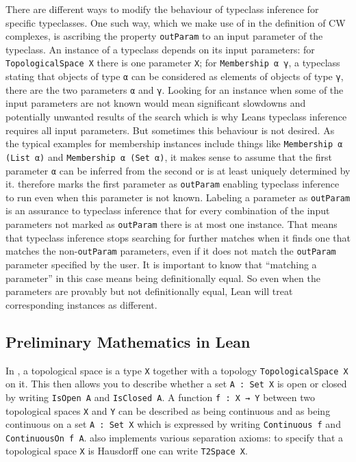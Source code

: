 There are different ways to modify the behaviour of typeclass inference for specific typeclasses. 
One such way, which we make use of in the definition of CW complexes, is ascribing the property \lstinline|outParam| to an input parameter of the typeclass. 
An instance of a typeclass depends on its input parameters: for \lstinline|TopologicalSpace X| there is one parameter \lstinline|X|; for \lstinline|Membership α γ|, a typeclass stating that objects of type \lstinline|α| can be considered as elements of objects of type \lstinline|γ|, there are the two parameters \lstinline|α| and \lstinline|γ|.
Looking for an instance when some of the input parameters are not known would mean significant slowdowns and potentially unwanted results of the search which is why Leans typeclass inference requires all input parameters. 
But sometimes this behaviour is not desired. 
As the typical examples for membership instances include things like \lstinline|Membership α (List α)| and \lstinline|Membership α (Set α)|, it makes sense to assume that the first parameter \lstinline|α| can be inferred from the second or is at least uniquely determined by it. 
\mathlib therefore marks the first parameter as \lstinline|outParam| enabling typeclass inference to run even when this parameter is not known.
Labeling a parameter as \lstinline|outParam| is an assurance to typeclass inference that for every combination of the input parameters not marked as \lstinline|outParam| there is at most one instance. 
That means that typeclass inference stops searching for further matches when it finds one that matches the non-\lstinline|outParam| parameters, even if it does not match the \lstinline|outParam| parameter specified by the user. 
It is important to know that ``matching a parameter'' in this case means being definitionally equal. 
So even when the parameters are provably but not definitionally equal, Lean will treat corresponding instances as different.

\subsection{Preliminary Mathematics in Lean}

In \mathlib, a topological space is a type \lstinline|X| together with a topology \lstinline|TopologicalSpace X| on it.
This then allows you to describe whether a set \lstinline|A : Set X| is open or closed by writing \lstinline|IsOpen A| and \lstinline|IsClosed A|. 
A function \lstinline|f : X → Y| between two topological spaces \lstinline|X| and \lstinline|Y| can be described as being continuous and as being continuous on a set \lstinline|A : Set X| which is expressed by writing \lstinline|Continuous f| and \lstinline|ContinuousOn f A|. 
\mathlib also implements various separation axioms: to specify that a topological space \lstinline|X| is Hausdorff one can write \lstinline|T2Space X|.

